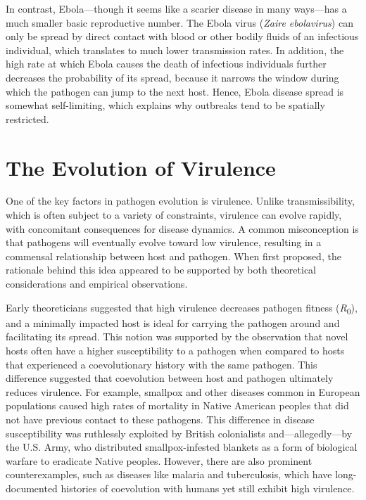 \documentclass[
]{book}
\begin{document}
In contrast, Ebola---though it seems like a scarier disease in many ways---has a much smaller basic reproductive number. The Ebola virus (\emph{Zaire ebolavirus}) can only be spread by direct contact with blood or other bodily fluids of an infectious individual, which translates to much lower transmission rates. In addition, the high rate at which Ebola causes the death of infectious individuals further decreases the probability of its spread, because it narrows the window during which the pathogen can jump to the next host. Hence, Ebola disease spread is somewhat self-limiting, which explains why outbreaks tend to be spatially restricted.

\hypertarget{the-evolution-of-virulence}{%
\section{The Evolution of Virulence}\label{the-evolution-of-virulence}}

One of the key factors in pathogen evolution is virulence. Unlike transmissibility, which is often subject to a variety of constraints, virulence can evolve rapidly, with concomitant consequences for disease dynamics. A common misconception is that pathogens will eventually evolve toward low virulence, resulting in a commensal relationship between host and pathogen. When first proposed, the rationale behind this idea appeared to be supported by both theoretical considerations and empirical observations.

Early theoreticians suggested that high virulence decreases pathogen fitness (\emph{R}\textsubscript{0}), and a minimally impacted host is ideal for carrying the pathogen around and facilitating its spread. This notion was supported by the observation that novel hosts often have a higher susceptibility to a pathogen when compared to hosts that experienced a coevolutionary history with the same pathogen. This difference suggested that coevolution between host and pathogen ultimately reduces virulence. For example, smallpox and other diseases common in European populations caused high rates of mortality in Native American peoples that did not have previous contact to these pathogens. This difference in disease susceptibility was ruthlessly exploited by British colonialists and---allegedly---by the U.S. Army, who distributed smallpox-infested blankets as a form of biological warfare to eradicate Native peoples. However, there are also prominent counterexamples, such as diseases like malaria and tuberculosis, which have long-documented histories of coevolution with humans yet still exhibit high virulence.
\end{document}
